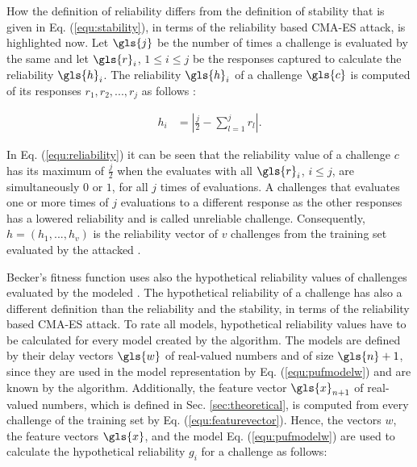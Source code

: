 How the definition of reliability differs from the definition of stability that is given in Eq. (\ref{equ:stability}), in terms of the reliability based \ac{CMA-ES} attack, is highlighted now.
Let $\gls{j}$ be the number of times a challenge is evaluated by the same \puf and let $\gls{r}_i$, $1 \le i \le j$ be the responses captured to calculate the reliability $\gls{h}_i$.
The reliability $\gls{h}_i$ of a challenge $\gls{c}$ is computed of its responses $r_1, r_2, ..., r_j$ as follows \cite{Becker2015ThePUFs}:

\begin{align}
h_i &= |\frac{j}{2} - \sum_{l = 1}^{j}r_l|. \label{equ:reliability}
\end{align}


In Eq. (\ref{equ:reliability}) it can be seen that the reliability value of a challenge $c$ has its maximum of $\frac{j}{2}$ when the \puf evaluates with all $\gls{r}_i$, $i \le j$, are simultaneously $0$ or $1$, for all $j$ times of evaluations. %
A challenges that evaluates one or more times of $j$ evaluations to a different response as the other responses has a lowered reliability and is called unreliable challenge.
Consequently, $h = (h_1, ..., h_v)$ is the reliability vector of $v$ challenges from the training set evaluated by the attacked \puf.

Becker's fitness function uses also the hypothetical reliability values of challenges evaluated by the modeled \pufs.
The hypothetical reliability of a challenge has also a different definition than the reliability and the stability, in terms of the reliability based \ac{CMA-ES} attack.
To rate all models, hypothetical reliability values have to be calculated for every model created by the algorithm.
The models are defined by their delay vectors $\gls{w}$ of real-valued numbers and of size $\gls{n} + 1$, since they are used in the \apuf model representation by Eq. (\ref{equ:pufmodelw}) and are known by the algorithm. %
Additionally, the feature vector $\gls{x}_{n+1}$ of real-valued numbers, which is defined in Sec. \ref{sec:theoretical}, is computed from every challenge of the training set by Eq. (\ref{equ:featurevector}).
Hence, the vectors $w$, the feature vectors $\gls{x}$, and the \apuf model Eq. (\ref{equ:pufmodelw}) are used to calculate the hypothetical reliability $g_i$ for a challenge as follows:

